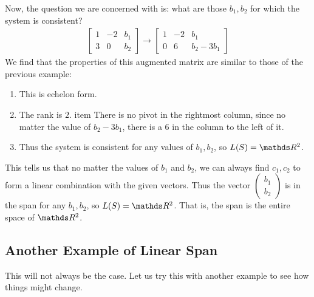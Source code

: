 \documentclass[11pt]{article}
\begin{document}
Now, the question we are concerned with is: what are those $b_1, b_2$ for which the system is consistent?
\begin{align*}
\left[
\begin{matrix}
1 & -2 & b_1
\\
3 & 0 & b_2
\end{matrix}
\right]
\to
\left[
\begin{matrix}
1 & -2 & b_1
\\
0 & 6 & b_2 - 3 b_1
\end{matrix}
\right]
\end{align*}
We find that the properties of this augmented matrix are similar to those of the previous example:
\begin{enumerate}
\item{
This is echelon form.
}
\item{
The rank is $2$.
}
item{
There is no pivot in the rightmost column, since no matter the value of $b_2 - 3 b_1$, there is a $6$ in the column to the left of it.
}
\item{
Thus the system is consistent for any values of $b_1, b_2$, so $L(S) = \bbR^2$.
}
\end{enumerate}
This tells us that no matter the values of $b_1$ and $b_2$, we can always find $c_1, c_2$ to form a linear combination with the given vectors. Thus the vector $\begin{pmatrix}b_1\\b_2\end{pmatrix}$ is in the span for any $b_1,b_2$, so $L(S) = \bbR^2$. That is, the span is the entire space of $\bbR^2$.


\subsection*{Another Example of Linear Span}

This will not always be the case. Let us try this with another example to see how things might change.
\end{document}

